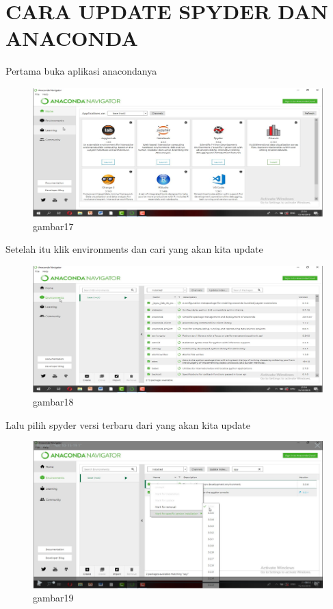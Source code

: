 \section{CARA UPDATE SPYDER DAN ANACONDA}
Pertama buka aplikasi anacondanya
\begin{figure}[h]
\centering
    \includegraphics[scale=0.9]{section/51.png}
\caption{gambar17}
\label{fig:my_label}
\end{figure}

Setelah itu klik environments dan cari yang akan kita update
\begin{figure}[h]
\centering
    \includegraphics[scale=0.9]{section/52.png}
\caption{gambar18}
\label{fig:my_label}
\end{figure}

Lalu pilih spyder versi terbaru dari yang akan kita update
\begin{figure}[h]
\centering
    \includegraphics[scale=0.9]{section/53.png}
\caption{gambar19}
\label{fig:my_label}
\end{figure}

